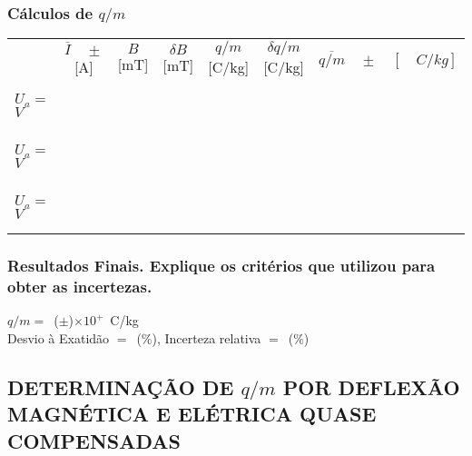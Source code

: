 \documentclass[a4paper,12pt]{article}  %
\begin{document}
\subsubsection{\sf Cálculos de $q/m$}
\label{sec:calc}
\begin{center}
	\begin{tabular}{l|c|c|c|c|c|c|}
	\cline{2-7}
	 & $\overline{I}\quad \pm$ [A] &  $B$ [mT] & $\delta B$  [mT] & $q/m$ [C/kg] & $\delta q/m$ [C/kg] & $\overline{q/m}\quad \pm \quad [\quad C/kg]$\\ \cline{2-7}
	 &&&&&&   \\ \cline{2-6}
	 &&&&&& \\ \cline{2-6}
	 $U_a=$ \underline{\makebox[1.2cm][r]{~}}$V$   &&&&&&  \\ \cline{2-6}
	 &&&&&& \\ \cline{2-6}
	 &&&&&& \\ \hline \hline
	  
	 &&&&&& \\ \cline{2-6}
	 &&&&&& \\ \cline{2-6}
	$U_a=$ \underline{\makebox[1.2cm][r]{~}}$V$  &&&&&& \\
	\cline{2-6}
	 &&&&&& \\ \cline{2-6}
	 &&&&&& \\
	 \hline \hline
	 &&&&&& \\ \cline{2-6}
	 &&&&&& \\ \cline{2-6}
	 $U_a=$ \underline{\makebox[1.2cm][r]{~}}$V$  &&&&&& \\ \cline{2-6}
	 &&&&&& \\ \cline{2-6}
	 &&&&&& \\
	 \cline{2-7} 
 	\end{tabular}
\end{center}


\subsubsection{\sf Resultados Finais. Explique os critérios que utilizou para obter as incertezas.}
\noindent  $q/m =$~(\underline{\makebox[1.5cm][r]{~}}$\pm$\underline{\makebox[1cm][r]{~}})$\times 10^{+}\,$  C/kg  \\  

\noindent  Desvio à Exatidão $=$~\underline{\makebox[1cm][r]{~}}(\%), 
Incerteza relativa $=$~\underline{\makebox[1cm][r]{~}}($\%$) 

\subsection{\sf DETERMINAÇÃO DE $q/m$ POR DEFLEXÃO\\ MAGNÉTICA E ELÉTRICA QUASE COMPENSADAS }
\end{document}
